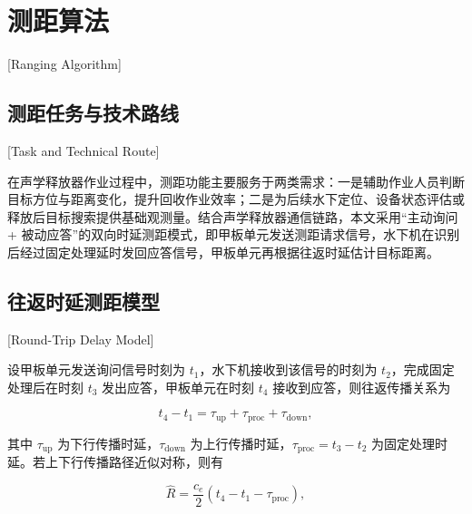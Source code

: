 
%
%
%

\chapter{测距算法}[Ranging Algorithm]
\label{chap04}

\section{测距任务与技术路线}[Task and Technical Route]

在声学释放器作业过程中，测距功能主要服务于两类需求：一是辅助作业人员判断目标方位与距离变化，提升回收作业效率；二是为后续水下定位、设备状态评估或释放后目标搜索提供基础观测量。结合声学释放器通信链路，本文采用“主动询问 + 被动应答”的双向时延测距模式，即甲板单元发送测距请求信号，水下机在识别后经过固定处理延时发回应答信号，甲板单元再根据往返时延估计目标距离\cite{LiangBoZhongChengShuiXiaCeJuJiYaoKongXiTongZhuKongJiSheJi2009,ZhangMeiKaiJiYuSTM32ChuLiQiDeShuiXiaXinBiaoDeZhuDongCeJuSheJi2016}。

\section{往返时延测距模型}[Round-Trip Delay Model]

设甲板单元发送询问信号时刻为 $t_1$，水下机接收到该信号的时刻为 $t_2$，完成固定处理后在时刻 $t_3$ 发出应答，甲板单元在时刻 $t_4$ 接收到应答，则往返传播关系为

\begin{equation}
  t_4 - t_1 = \tau_{\mathrm{up}} + \tau_{\mathrm{proc}} + \tau_{\mathrm{down}},
  \label{eq:rtt_model}
\end{equation}

其中 $\tau_{\mathrm{up}}$ 为下行传播时延，$\tau_{\mathrm{down}}$ 为上行传播时延，$\tau_{\mathrm{proc}} = t_3 - t_2$ 为固定处理时延。若上下行传播路径近似对称，则有

\begin{equation}
  \hat{R} = \frac{c_e}{2}\left(t_4 - t_1 - \tau_{\mathrm{proc}}\right),
  \label{eq:range_estimation}
\end{equation}

